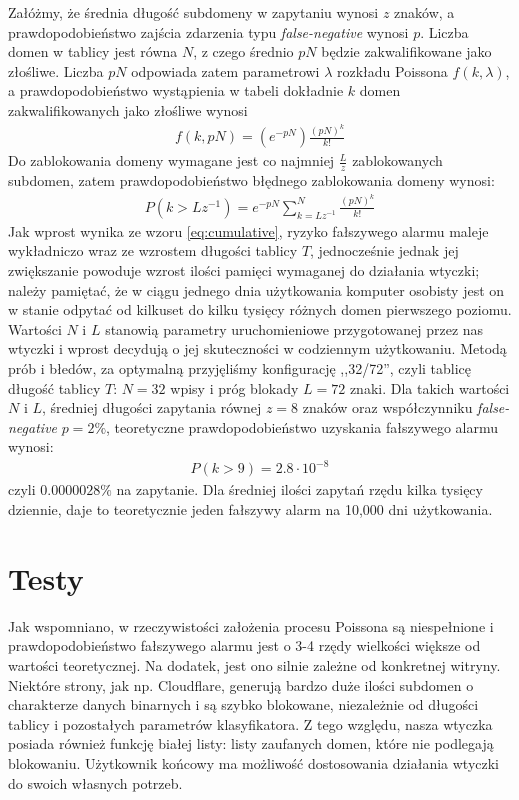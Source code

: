 \documentclass{eiti-raport}
\begin{document}
Załóżmy, że średnia długość subdomeny w zapytaniu wynosi $z$ znaków, a prawdopodobieństwo zajścia zdarzenia typu \emph{false-negative} wynosi $p$. Liczba domen w tablicy jest równa $N$, z czego średnio $pN$ będzie zakwalifikowane jako złośliwe. Liczba $pN$ odpowiada zatem parametrowi $\lambda$ rozkładu Poissona $f(k,\lambda)$, a prawdopodobieństwo wystąpienia w tabeli dokładnie $k$ domen zakwalifikowanych jako złośliwe wynosi 
\begin{align}
f(k,pN) = \left( e^{-pN} \right) \frac{ \left( pN \right)^k }{k!}
\end{align}
Do zablokowania domeny wymagane jest co najmniej $\frac{L}{z}$ zablokowanych subdomen, zatem prawdopodobieństwo błędnego zablokowania domeny wynosi:
\begin{align} \label{eq:cumulative}
P\left( k > Lz^{-1} \right) = e^{-pN} \sum_{k = Lz^{-1}}^{N} \frac{ \left( pN \right)^k }{k!}
\end{align}
Jak wprost wynika ze wzoru \ref{eq:cumulative}, ryzyko fałszywego alarmu maleje wykładniczo wraz ze wzrostem długości tablicy $T$, jednocześnie jednak jej zwiększanie powoduje wzrost ilości pamięci wymaganej do działania wtyczki; należy pamiętać, że w ciągu jednego dnia użytkowania komputer osobisty jest on w stanie odpytać od kilkuset do kilku tysięcy różnych domen pierwszego poziomu. Wartości $N$ i $L$ stanowią parametry uruchomieniowe przygotowanej przez nas wtyczki i wprost decydują o jej skuteczności w codziennym użytkowaniu. Metodą prób i błedów, za optymalną przyjęliśmy konfigurację ,,32/72'', czyli tablicę długość tablicy $T$: $N = 32$ wpisy i próg blokady $L = 72$ znaki. Dla takich wartości $N$ i $L$, średniej długości zapytania równej $z = 8$ znaków oraz współczynniku \emph{false-negative} $p = 2\%$, teoretyczne prawdopodobieństwo uzyskania fałszywego alarmu wynosi:
\begin{align*}
P \left( k > 9 \right) = 2.8 \cdot 10^{-8}
\end{align*}
czyli $0.0000028\%$ na zapytanie. Dla średniej ilości zapytań rzędu kilka tysięcy dziennie, daje to teoretycznie jeden fałszywy alarm na 10,000 dni użytkowania. 

\section{Testy}
Jak wspomniano, w rzeczywistości założenia procesu Poissona są niespełnione i prawdopodobieństwo fałszywego alarmu jest o 3-4 rzędy wielkości większe od wartości teoretycznej. Na dodatek, jest ono silnie zależne od konkretnej witryny. Niektóre strony, jak np. Cloudflare, generują bardzo duże ilości subdomen o charakterze danych binarnych i są szybko blokowane, niezależnie od długości tablicy i pozostałych parametrów klasyfikatora. Z tego względu, nasza wtyczka posiada również funkcję białej listy: listy zaufanych domen, które nie podlegają blokowaniu. Użytkownik końcowy ma możliwość dostosowania działania wtyczki do swoich własnych potrzeb. 
\end{document}
